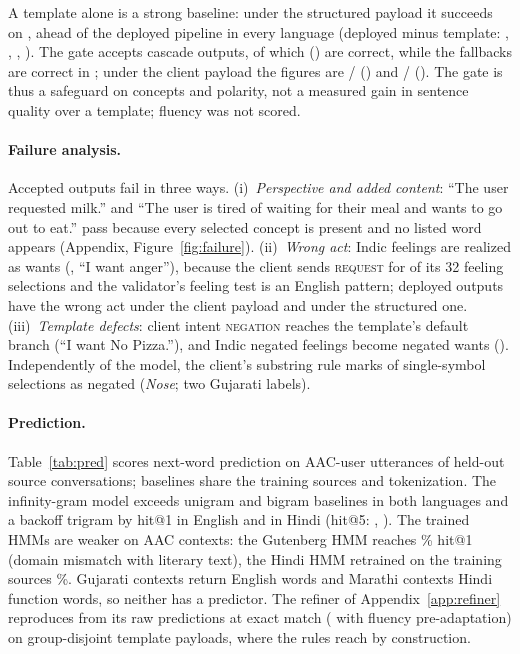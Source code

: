 A template alone is a strong baseline: under the structured payload it succeeds on \SuccTmplS{}, ahead of the deployed pipeline in every language (deployed minus template: \PSTEN{}, \PSTHI{}, \PSTGU{}, \PSTMR{}).
The gate accepts \GateAccS{} cascade outputs, of which \GateAccOkS{} (\GateAccPctS{}) are correct, while the \GateFbS{} fallbacks are correct in \GateFbPctS{}; under the client payload the figures are \GateAccOkU{}/\GateAccU{} (\GateAccPctU{}) and \GateFbOkU{}/\GateFbU{} (\GateFbPctU{}).
The gate is thus a safeguard on concepts and polarity, not a measured gain in sentence quality over a template; fluency was not scored.

\paragraph{Failure analysis.}
Accepted outputs fail in three ways.
(i)~\emph{Perspective and added content}: ``The user requested milk.'' and ``The user is tired of waiting for their meal and wants to go out to eat.'' pass because every selected concept is present and no listed word appears (Appendix, Figure~\ref{fig:failure}).
(ii)~\emph{Wrong act}: Indic feelings are realized as wants (, ``I want anger''), because the client sends \textsc{request} for \UIFeelReq{} of its 32 feeling selections and the validator's feeling test is an English pattern; \ActWrongDepU{} deployed outputs have the wrong act under the client payload and \ActWrongDepS{} under the structured one.
(iii)~\emph{Template defects}: client intent \textsc{negation} reaches the template's default branch (``I want No Pizza.''), and Indic negated feelings become negated wants ().
Independently of the model, the client's substring rule marks \UIFalseNeg{} of \UISingle{} single-symbol selections as negated (\emph{Nose}; two Gujarati labels).



\paragraph{Prediction.}
Table~\ref{tab:pred} scores next-word prediction on AAC-user utterances of held-out source conversations; baselines share the training sources and tokenization.
The infinity-gram model exceeds unigram and bigram baselines in both languages and a backoff trigram by \PredDENOneTri{} hit@1 in English and \PredDHIOneTri{} in Hindi (hit@5: \PredDENFiveTri{}, \PredDHIFiveTri{}).
The trained HMMs are weaker on AAC contexts: the Gutenberg HMM reaches \GutHitOne{}\% hit@1 (domain mismatch with literary text), the Hindi HMM retrained on the training sources \HiHmmHitOne{}\%.
Gujarati contexts return English words and Marathi contexts Hindi function words, so neither has a predictor.
The refiner of Appendix~\ref{app:refiner} reproduces from its raw predictions at \RefAModelPct{} exact match (\RefFModelPct{} with fluency pre-adaptation) on group-disjoint template payloads, where the rules reach \RefARulesPct{} by construction.

